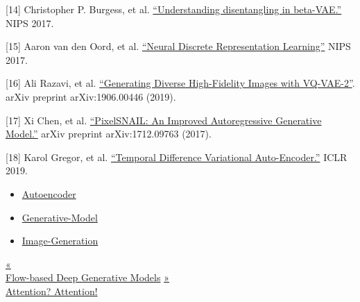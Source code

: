 {[}14{]} Christopher P. Burgess, et al. \href{https://arxiv.org/abs/1804.03599}{``Understanding disentangling in beta-VAE.''} NIPS 2017.

{[}15{]} Aaron van den Oord, et al. \href{https://arxiv.org/abs/1711.00937}{``Neural Discrete Representation Learning''} NIPS 2017.

{[}16{]} Ali Razavi, et al. \href{https://arxiv.org/abs/1906.00446}{``Generating Diverse High-Fidelity Images with VQ-VAE-2''}. arXiv preprint arXiv:1906.00446 (2019).

{[}17{]} Xi Chen, et al. \href{https://arxiv.org/abs/1712.09763}{``PixelSNAIL: An Improved Autoregressive Generative Model.''} arXiv preprint arXiv:1712.09763 (2017).

{[}18{]} Karol Gregor, et al. \href{https://arxiv.org/abs/1806.03107}{``Temporal Difference Variational Auto-Encoder.''} ICLR 2019.

\begin{itemize}
\tightlist
\item
  \href{https://lilianweng.github.io/tags/autoencoder/}{Autoencoder}
\item
  \href{https://lilianweng.github.io/tags/generative-model/}{Generative-Model}
\item
  \href{https://lilianweng.github.io/tags/image-generation/}{Image-Generation}
\end{itemize}

\href{https://lilianweng.github.io/posts/2018-10-13-flow-models/}{{« }\\
{Flow-based Deep Generative Models}} \href{https://lilianweng.github.io/posts/2018-06-24-attention/}{{ »}\\
{Attention? Attention!}}

